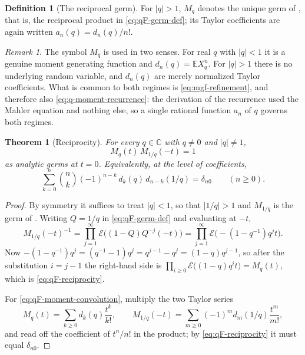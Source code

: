 \documentclass[11pt,oneside,openany]{book}
\newtheorem{theorem}{Theorem}[chapter]
\theoremstyle{definition}
\newtheorem{definition}[definition]{Definition}
\theoremstyle{remark}
\newtheorem{remark}[remark]{Remark}
\newcommand{\C}{\mathbb C}
\newcommand{\abs}[1]{\lvert #1\rvert}
\begin{document}
\begin{definition}[The reciprocal germ]\label{def:qF-germ}
For $\abs q>1$, $M_q$ denotes the unique germ of
, that is, the reciprocal product in
\eqref{eq:qF-germ-def}; its Taylor coefficients are again written
$a_n(q)=d_n(q)/n!$.
\end{definition}

\begin{remark}\label{rem:qF-germ-not-mgf}
The symbol $M_q$ is used in two senses.  For real $q$ with $\abs q<1$ it is a
genuine moment generating function and $d_n(q)=\mathbb EX_q^n$.  For $\abs q>1$
there is no underlying random variable, and $d_n(q)$ are merely normalized
Taylor coefficients.  What is common to both regimes is \eqref{eq:mgf-refinement},
and therefore also \eqref{eq:q-moment-recurrence}: the derivation of the
recurrence used the Mahler equation and nothing else, so a single rational
function $a_n$ of $q$ governs both regimes.
\end{remark}

\begin{theorem}[Reciprocity]\label{thm:qF-reciprocity}
For every $q\in\C$ with $q\ne0$ and $\abs q\ne1$,
\begin{equation}\label{eq:qF-reciprocity}
 M_q(t)\,M_{1/q}(-t)=1
\end{equation}
as analytic germs at $t=0$.  Equivalently, at the level of coefficients,
\begin{equation}\label{eq:qF-moment-convolution}
 \sum_{k=0}^{n}\binom nk(-1)^{n-k}\,d_k(q)\,d_{n-k}(1/q)=\delta_{n0}
 \qquad(n\ge0).
\end{equation}
\end{theorem}

\begin{proof}
By symmetry it suffices to treat $\abs q<1$, so that $\abs{1/q}>1$ and
$M_{1/q}$ is the germ of .  Writing $Q=1/q$ in
\eqref{eq:qF-germ-def} and evaluating at $-t$,
\[
 M_{1/q}(-t)^{-1}
 =\prod_{j=1}^{\infty}\mathcal E\bigl((1-Q)Q^{-j}(-t)\bigr)
 =\prod_{j=1}^{\infty}\mathcal E\bigl(-(1-q^{-1})q^{j}t\bigr).
\]
Now $-(1-q^{-1})q^{j}=(q^{-1}-1)q^{j}=q^{j-1}-q^{j}=(1-q)q^{j-1}$, so after the
substitution $i=j-1$ the right-hand side is
$\prod_{i\ge0}\mathcal E\bigl((1-q)q^{i}t\bigr)=M_q(t)$, which is
\eqref{eq:qF-reciprocity}.

For \eqref{eq:qF-moment-convolution}, multiply the two Taylor series
\[
 M_q(t)=\sum_{k\ge0}d_k(q)\frac{t^k}{k!},
 \qquad
 M_{1/q}(-t)=\sum_{m\ge0}(-1)^md_m(1/q)\frac{t^m}{m!},
\]
and read off the coefficient of $t^n/n!$ in the product; by
\eqref{eq:qF-reciprocity} it must equal $\delta_{n0}$.
\end{proof}
\end{document}

